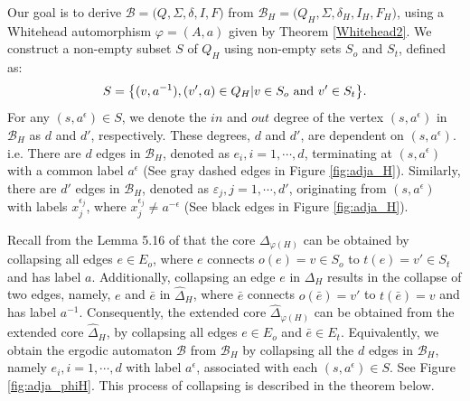 \documentclass{article}
\newcommand{\B}{\mathcal{B}}
\newcommand{\e}{\epsilon}
\newcommand{\ee}{\varepsilon}
\begin{document}
    Our goal is to derive $\B = \bigl(Q, \Sigma, \delta, I, F\bigr)$ from $\B_H = \bigl(Q_H, \Sigma, \delta_H, I_H, F_H\bigr)$, using a Whitehead automorphism $\varphi=(A,a)$ given by Theorem \ref{Whitehead2}. We construct a non-empty subset $S$ of $Q_H$ using non-empty sets $S_o$ and $S_t$, defined as:
    $$S = \bigl\{(v, a^{-1}) , (v',a) \in Q_H | v \in S_o \textnormal{ and } v' \in S_t\bigr\}.$$
    For any $(s,a^{\e}) \in S$, we denote the $in$ and $out$ degree of the vertex $(s,a^{\e})$ in $\B_H$ as $d$ and $d'$, respectively. These degrees, $d$ and $d'$, are dependent on $(s,a^{\e})$. i.e. There are $d$ edges in $\B_H$, denoted as $\displaystyle e_i, i = 1,\cdots,d$, terminating at $(s,a^{\e})$ with a common label $a^{\e}$ (See gray dashed edges in Figure \ref{fig:adja_H}). Similarly, there are $d'$ edges in $\B_H$, denoted as $\displaystyle \ee_j, j = 1,\cdots,d'$, originating from $(s,a^{\e})$ with labels $x_j^{\e_j}$, where $x_j^{\e_j} \neq a^{-\e}$ (See black edges in Figure \ref{fig:adja_H}). 
    
    Recall from the Lemma 5.16 of \cite{ascari2021fine} that the core $\Delta_{\varphi(H)}$ can be obtained by collapsing all edges $e \in E_o$, where $e$ connects $o(e) = v \in S_o$ to $t(e) = v'\in S_t$ and has label $a$. Additionally, collapsing an edge $e$ in $\Delta_H$ results in the collapse of two edges, namely, $e$ and $\bar{e}$ in $\widehat{\Delta}_H$, where $\bar{e}$ connects $o(\bar{e}) = v'$ to $t(\bar{e}) = v$ and has label $a^{-1}$. Consequently, the extended core $\widehat{\Delta}_{\varphi(H)}$ can be obtained from the extended core $\widehat{\Delta}_H$, by collapsing all edges $e \in E_o$ and $\bar{e} \in E_t$. Equivalently, we obtain the ergodic automaton $\B$ from $\B_H$ by collapsing all the $d$ edges in $\B_H$, namely $\displaystyle e_i, i = 1,\cdots,d$ with label $a^{\e}$, associated with each $(s,a^{\e}) \in S$. See Figure \ref{fig:adja_phiH}. This process of collapsing is described in the theorem below.
    
\end{document}
